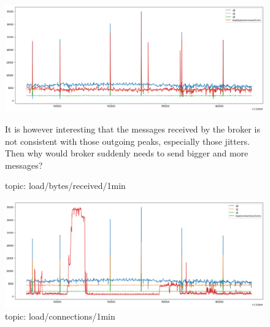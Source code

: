 \documentclass[12pt, letterpaper]{article}
\begin{document}
\begin{figure}
	\setlength{\tabcolsep}{0pt}
	\caption{topic: load/bytes/received/1min}
	\label{f:valid_cnt_load_bytes_received_1min}
	\begin{center}
		\includegraphics[width=\textwidth]{valid_cnt/valid_cnt-load_bytes_received_1min}	
	\end{center}
	It is however interesting that the messages received by the broker is not consistent with those outgoing peaks, especially those jitters. Then why would broker suddenly needs to send bigger and more messages?
\end{figure}

\begin{figure}
	\setlength{\tabcolsep}{0pt}
	\caption{topic: load/connections/1min}
	\label{f:valid_cnt_load_connections_1min}
	\begin{center}
		\includegraphics[width=\textwidth]{valid_cnt/valid_cnt-load_connections_1min}	
	\end{center}
\end{figure}
\end{document}
